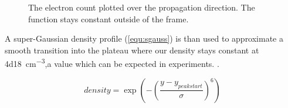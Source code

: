 \documentclass[bachelor_thesis]{subfiles}
\begin{document}
\begin{figure}
\missingfigure{}
\caption{The electron count plotted over the propagation direction. The function stays constant outside of the frame.}\label{fig:dens}
\end{figure}

A super-Gaussian density profile (\autoref{equ:sgauss}) is than used to approximate a smooth transition into the plateau where our density stays constant at \qty{4d18}{\cm^{-3}},a value which can be expected in experiments. \cite{Schoebel2022, Kurz2021}. 

\begin{equation}
density = \exp\left(-\left(\frac{y-y_{peak start}}{\sigma}\right)^6\right)
\label{equ:sgauss}
\end{equation}
\end{document}
